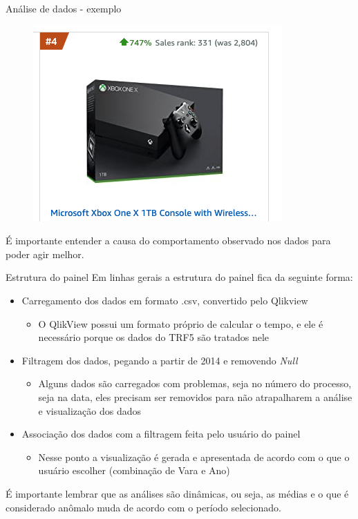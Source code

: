 \documentclass[10pt,t]{beamer}
\begin{document}
\begin{frame}{Análise de dados - exemplo}
	\begin{figure}
		\centering
		\includegraphics[scale=0.55]{./imagens/xbox_vendas.png}
	\end{figure}
É importante entender a causa do comportamento observado nos dados para poder agir melhor.
\end{frame}

\begin{frame}{Estrutura do painel}
\vspace{8pt}
Em linhas gerais a estrutura do painel fica da seguinte forma:
    \begin{itemize}
        \item Carregamento dos dados em formato .csv, convertido pelo Qlikview
        \begin{itemize}
        	\item O QlikView possui um formato próprio de calcular o tempo, e ele é necessário porque os dados do TRF5 são tratados nele
        \end{itemize}
        \item Filtragem dos dados, pegando a partir de 2014 e removendo \textit{Null}
        \begin{itemize}
        	\item Alguns dados são carregados com problemas, seja no número do processo, seja na data, eles precisam ser removidos para não atrapalharem a análise e visualização dos dados
        \end{itemize}
        \item Associação dos dados com a filtragem feita pelo usuário do painel
        \begin{itemize}
        	\item Nesse ponto a visualização é gerada e apresentada de acordo com o que o usuário escolher (combinação de Vara e Ano)
        \end{itemize}
    \end{itemize}
É importante lembrar que as análises são dinâmicas, ou seja, as médias e o que é considerado anômalo muda de acordo com o período selecionado.
\end{frame}
\end{document}

